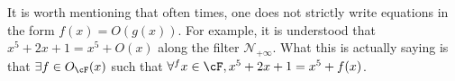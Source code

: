 It is worth mentioning that often times, one does not strictly write equations in the form \(f(x) = O(g(x))\). For example, it is understood that \(x^5 + 2x + 1 = x^5 + O(x)\) along the filter \(\mathcal{N}_{+\infty}\). What this is actually saying is that \(\exists f \in O_{\cF}(x)\) such that \(\forall^f x \in \cF, x^5 + 2x + 1 = x^5 + f(x)\).
